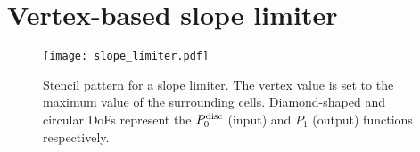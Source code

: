 \documentclass[thesis]{subfiles}
\begin{document}






\section{Vertex-based slope limiter}


\begin{figure}
  \centering
  \texttt{[image: slope\_limiter.pdf]}
  \caption{
    Stencil pattern for a slope limiter.
    The vertex value is set to the maximum value of the surrounding cells.
    Diamond-shaped and circular DoFs represent the $P_0^\textnormal{disc}$ (input) and $P_1$ (output) functions respectively.
  }
  \label{fig:slope_limiter_stencil}
\end{figure}
\end{document}
